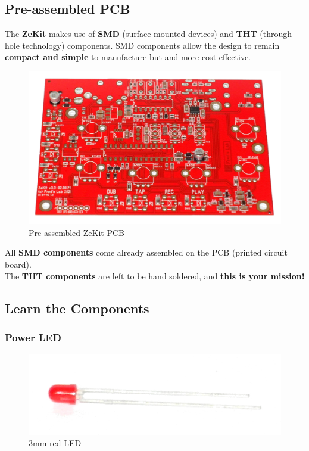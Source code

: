 \documentclass{scrartcl}
\begin{document}
\pagebreak
\subsection{Pre-assembled PCB}

The \textbf{ZeKit} makes use of \textbf{SMD} (surface mounted devices) and \textbf{THT} (through hole technology) components. SMD components allow the design to remain \textbf{compact and simple} to manufacture but and more cost effective.

\begin{figure}[!ht]
    \begin{center}
        \includegraphics[scale=0.10]{assets/zekit-unassembled.jpg}
        \caption{Pre-assembled ZeKit PCB}
    \end{center}
\end{figure}

All \textbf{SMD components} come already assembled on the PCB (printed circuit board). \\
The \textbf{THT components} are left to be hand soldered, and \textbf{this is your mission!}

\subsection{Learn the Components}

\subsubsection{Power LED}

\begin{figure}[!ht]
    \begin{center}
        \includegraphics[scale=0.15]{assets/zekit-led.jpg}
        \caption{3mm red LED}
    \end{center}
\end{figure}
\end{document}

